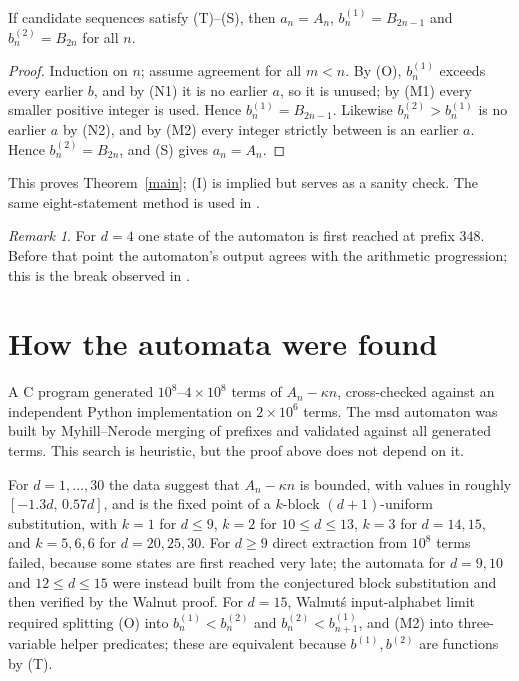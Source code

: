 \documentclass[11pt]{article}
\theoremstyle{remark}\newtheorem{remark}[theorem]{Remark}
\begin{document}
\begin{lemma}
If candidate sequences satisfy (T)--(S), then \(a_n=A_n\), \(b^{(1)}_n=B_{2n-1}\) and \(b^{(2)}_n=B_{2n}\) for all \(n\).
\end{lemma}
\begin{proof}
Induction on \(n\); assume agreement for all \(m<n\). By (O), \(b^{(1)}_n\) exceeds every earlier \(b\), and by (N1) it is no earlier \(a\), so it is unused; by (M1) every smaller positive integer is used. Hence \(b^{(1)}_n=B_{2n-1}\). Likewise \(b^{(2)}_n>b^{(1)}_n\) is no earlier \(a\) by (N2), and by (M2) every integer strictly between is an earlier \(a\). Hence \(b^{(2)}_n=B_{2n}\), and (S) gives \(a_n=A_n\).
\end{proof}
This proves Theorem~\ref{main}; (I) is implied but serves as a sanity check. The same eight-statement method is used in \cite[Theorem~5]{fj}.

\begin{remark}
For \(d=4\) one state of the automaton is first reached at prefix \(348\). Before that point the automaton's output agrees with the arithmetic progression; this is the break observed in \cite{fj}.
\end{remark}

\section{How the automata were found}
A C program generated \(10^8\)--\(4\times10^8\) terms of \(A_n-\kappa n\), cross-checked against an independent Python implementation on \(2\times10^6\) terms. The msd automaton was built by Myhill--Nerode merging of prefixes and validated against all generated terms. This search is heuristic, but the proof above does not depend on it.

For \(d=1,\dots,30\) the data suggest that \(A_n-\kappa n\) is bounded, with values in roughly \([-1.3d,\,0.57d]\), and is the fixed point of a \(k\)-block \((d+1)\)-uniform substitution, with \(k=1\) for \(d\le9\), \(k=2\) for \(10\le d\le13\), \(k=3\) for \(d=14,15\), and \(k=5,6,6\) for \(d=20,25,30\). For \(d\ge9\) direct extraction from \(10^8\) terms failed, because some states are first reached very late; the automata for \(d=9,10\) and \(12\le d\le15\) were instead built from the conjectured block substitution and then verified by the Walnut proof. For \(d=15\), Walnut\'s input-alphabet limit required splitting (O) into \(b^{(1)}_n<b^{(2)}_n\) and \(b^{(2)}_n<b^{(1)}_{n+1}\), and (M2) into three-variable helper predicates; these are equivalent because \(b^{(1)},b^{(2)}\) are functions by (T).
\end{document}
